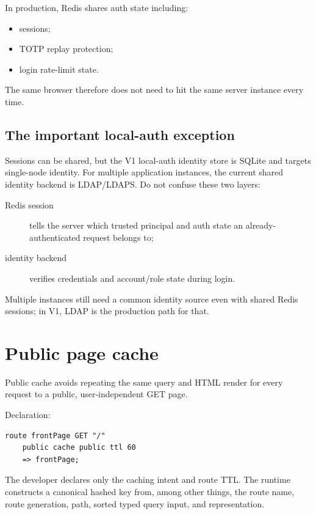 In production, Redis shares auth state including:

\begin{itemize}
  \item sessions;
  \item TOTP replay protection;
  \item login rate-limit state.
\end{itemize}

The same browser therefore does not need to hit the same server instance every time.

\subsection*{The important local-auth exception}

Sessions can be shared, but the V1 local-auth identity store is SQLite and targets single-node identity. For multiple application instances, the current shared identity backend is LDAP/LDAPS. Do not confuse these two layers:

\begin{description}
  \item[Redis session] tells the server which trusted principal and auth state an already-authenticated request belongs to;
  \item[identity backend] verifies credentials and account/role state during login.
\end{description}

Multiple instances still need a common identity source even with shared Redis sessions; in V1, LDAP is the production path for that.

\section{Public page cache}

Public cache avoids repeating the same query and HTML render for every request to a public, user-independent GET page.

Declaration:

\begin{lstlisting}[language=RWLang]
route frontPage GET "/"
    public cache public ttl 60
    => frontPage;
\end{lstlisting}

The developer declares only the caching intent and route TTL. The runtime constructs a canonical hashed key from, among other things, the route name, route generation, path, sorted typed query input, and representation.

